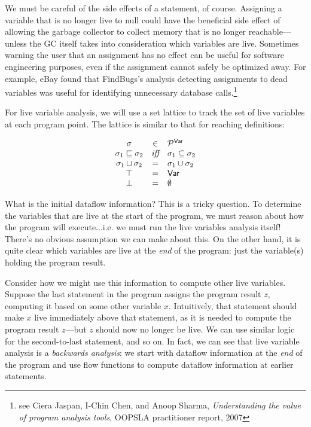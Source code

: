 \documentclass[11pt]{article}
\begin{document}
We must be careful of the side effects of a statement, of course.  Assigning a variable that is no longer live to null could have the beneficial side effect of allowing the garbage collector to collect memory that is no longer reachable---unless the GC itself takes into consideration which variables are live.  Sometimes warning the user that an assignment has no effect can be useful for software engineering purposes, even if the assignment cannot safely be optimized away.  For example, eBay found that FindBugs's analysis detecting assignments to dead variables was useful for identifying unnecessary database calls.\footnote{see Ciera Jaspan, I-Chin Chen, and Anoop Sharma, \textit{Understanding the value of program analysis tools}, OOPSLA practitioner report, 2007}

For live variable analysis, we will use a set lattice to track the set of live variables at each program point.  The lattice is similar to that for reaching definitions:

\[
\begin{array}{ccl}

\sigma & \in & \mathcal{P}^{\textsf{Var}}\\
\sigma_1 \sqsubseteq \sigma_2 & \textit{iff} & \sigma_1 \subseteq \sigma_2\\
\sigma_1 \sqcup \sigma_2 & = & \sigma_1 \cup \sigma_2\\
\top & = & \textsf{Var}\\
\bot & = & \emptyset\\

\end{array}
\]


What is the initial dataflow information?  This is a tricky question.  To determine the variables that are live at the start of the program, we must reason about how the program will execute...i.e. we must run the live variables analysis itself!  There's no obvious assumption we can make about this.  On the other hand, it is quite clear which variables are live at the \textit{end} of the program: just the variable(s) holding the program result.

Consider how we might use this information to compute other live variables.  Suppose the last statement in the program assigns the program result $z$, computing it based on some other variable $x$.  Intuitively, that statement should make $x$ live immediately above that statement, as it is needed to compute the program result $z$---but $z$ should now no longer be live.  We can use similar logic for the second-to-last statement, and so on.  In fact, we can see that live variable analysis is a \textit{backwards analysis}: we start with dataflow information at the \textit{end} of the program and use flow functions to compute dataflow information at earlier statements.
\end{document}
